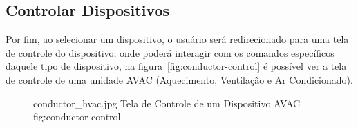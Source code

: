 \subsection{Controlar Dispositivos}
\label{sec:conductor-control}

Por fim, ao selecionar um dispositivo, o usuário será redirecionado para uma tela de controle do dispositivo, onde poderá
interagir com os comandos específicos daquele tipo de dispositivo, na figura~\ref{fig:conductor-control} é possível ver a tela de 
controle de uma unidade AVAC (Aquecimento, Ventilação e Ar Condicionado).

\begin{figure}[ht]
    {conductor_hvac.jpg}
    {Tela de Controle de um Dispositivo AVAC}
    {fig:conductor-control}
\end{figure}